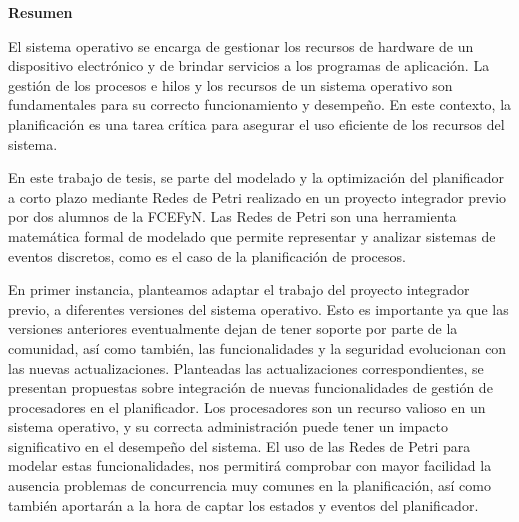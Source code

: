 \begin{Large}
    \textbf{Resumen}
    \vspace{.5cm}
\end{Large}

El sistema operativo se encarga de gestionar los recursos de hardware de un dispositivo electrónico y de brindar servicios a los programas de aplicación. La gestión de los procesos e hilos y los recursos de un sistema operativo son fundamentales para su correcto funcionamiento y desempeño. En este contexto, la planificación es una tarea crítica para asegurar el uso eficiente de los recursos del sistema.\par

En este trabajo de tesis, se parte del modelado y la optimización del planificador a corto plazo mediante Redes de Petri realizado en un proyecto integrador previo por dos alumnos de la FCEFyN. Las Redes de Petri son una herramienta matemática formal de modelado que permite representar y analizar sistemas de eventos discretos, como es el caso de la planificación de procesos.\par

En primer instancia, planteamos adaptar el trabajo del proyecto integrador previo,  a diferentes versiones del sistema operativo. Esto es importante ya que las versiones anteriores eventualmente dejan de tener soporte por parte de la comunidad, así como también, las funcionalidades y la seguridad evolucionan con las nuevas actualizaciones.   Planteadas las actualizaciones correspondientes, se presentan propuestas sobre integración de nuevas funcionalidades de gestión de procesadores en el planificador. Los procesadores son un recurso valioso en un sistema operativo, y su correcta administración puede tener un impacto significativo en el desempeño del sistema. El uso de las Redes de Petri para modelar estas funcionalidades, nos permitirá comprobar con mayor facilidad la ausencia problemas de concurrencia muy comunes en la planificación, así como también aportarán a la hora de captar los estados y eventos del planificador.\par
